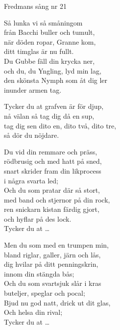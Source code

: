 \begin{song}{Fredmans sång nr 21}
	
	
	

	
	\showversenumber
	Så lunka vi så småningom\\
	från Bacchi buller och tumult,\\
	när döden ropar, Granne kom,\\
	ditt timglas är nu fullt.\\
	Du Gubbe fäll din krycka ner,\\
	och du, du Yngling, lyd min lag,\\
	den skönsta Nymph som åt dig ler\\
	inunder armen tag.
	
	Tycker du at grafven är för djup,\\
	nå välan så tag dig då en sup,\\
	tag dig sen dito en, dito två, dito tre,\\
	så dör du nöjdare.
	
	\showversenumber
	Du vid din remmare och präss,\\
	rödbrusig och med hatt på sned,\\
	snart skrider fram din likprocess\\
	i några svarta led;\\
	Och du som pratar där så stort,\\
	med band och stjernor på din rock,\\
	ren snickarn kistan färdig gjort,\\
	och hyflar på des lock.\\
	Tycker du at \ldots{}
	
	\showversenumber
	Men du som med en trumpen min,\\
	bland riglar, galler, järn och lås,\\
	dig hvilar på ditt penningskrin,\\
	innom din stängda bås;\\
	Och du som svartsjuk slår i kras\\
	buteljer, speglar och pocal;\\
	Bjud nu god natt, drick ut dit glas,\\
	Och helsa din rival;\\
	Tycker du at \ldots{}
	

\end{song}
